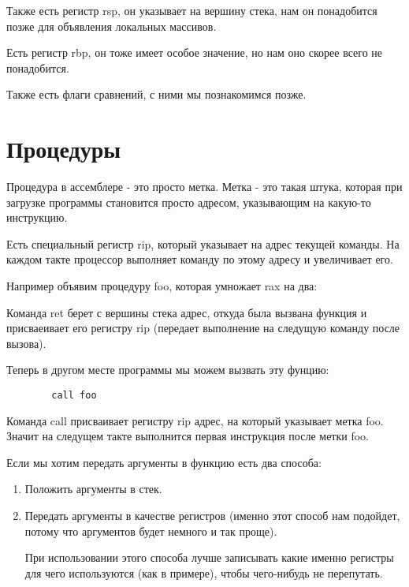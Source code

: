\documentclass[a4paper,12pt]{article}
\begin{document}
Также есть регистр rsp, он указывает на вершину стека, нам он
понадобится позже для объявления локальных массивов.

Есть регистр rbp, он тоже имеет особое значение, но нам оно скорее
всего не понадобится.

Также есть флаги сравнений, с ними мы познакомимся позже.

\section{Процедуры}

Процедура в ассемблере - это просто метка. Метка - это такая штука,
которая при загрузке программы становится просто адресом, указывающим
на какую-то инструкцию.

Есть специальный регистр rip, который указывает на адрес текущей
команды. На каждом такте процессор выполняет команду по этому адресу и
увеличивает его.

Например объявим процедуру foo, которая умножает rax на два:



Команда ret берет с вершины стека адрес, откуда была вызвана функция и
присваеивает его регистру rip (передает выполнение на следущую команду
после вызова).

Теперь в другом месте программы мы можем вызвать эту фунцию:

\begin{lstlisting}
        call foo            
\end{lstlisting}

Команда call присваивает регистру rip адрес, на который указывает
метка foo. Значит на следущем такте выполнится первая инструкция после
метки foo.

Если мы хотим передать аргументы в функцию есть два способа:

\begin{enumerate}
  \item Положить аргументы в стек.

    
      
  \item Передать аргументы в качестве регистров (именно этот способ
    нам подойдет, потому что аргументов будет немного и так проще).

    
          
    При использовании этого способа лучше записывать какие именно
    регистры для чего используются (как в примере), чтобы чего-нибудь
    не перепутать.

\end{enumerate}
\end{document}
